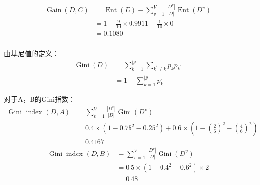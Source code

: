\documentclass[UTF8,a4paper,AutoFakeBold,AutoFakeSlant]{article}
\begin{document}
\begin{enumerate}
        \begin{equation*}
          \begin{aligned}
            \operatorname{Gain}(D,C) & = \operatorname{Ent}(D)-\sum_{v=1}^{V} \frac{\left|D^{v}\right|}{|D|} \operatorname{Ent}\left(D^{v}\right) \\
                                     & = 1 - \frac{9}{10}\times 0.9911 - \frac{1}{10}\times 0                                                     \\
                                     & = 0.1080
          \end{aligned}
        \end{equation*}
\end{enumerate}



\subsubsection{}
由基尼值的定义：
\begin{equation*}
  \begin{aligned}
    \operatorname{Gini}(D) & =\sum_{k=1}^{|\mathcal{Y}|} \sum_{k^{\prime} \neq k} p_{k} p_{k^{\prime}} \\
                           & =1-\sum_{k=1}^{|\mathcal{Y}|} p_{k}^{2}
  \end{aligned}
\end{equation*}

对于A，B的Gini指数：
\begin{equation*}
  \begin{aligned}
    \operatorname{Gini} \text { index }(D, A) & =\sum_{v=1}^{V} \frac{\left|D^{v}\right|}{|D|} \operatorname{Gini}\left(D^{v}\right) \\
                                              & = 0.4\times (1-0.75^2-0.25^2) + 0.6\times (1-(\frac{2}{6})^2-(\frac{4}{6})^2)        \\
                                              & = 0.4167
  \end{aligned}
\end{equation*}
\begin{equation*}
  \begin{aligned}
    \operatorname{Gini} \text { index }(D, B) & =\sum_{v=1}^{V} \frac{\left|D^{v}\right|}{|D|} \operatorname{Gini}\left(D^{v}\right) \\
                                              & = 0.5\times (1-0.4^2-0.6^2) \times 2                                                 \\
                                              & = 0.48
  \end{aligned}
\end{equation*}
\end{document}
